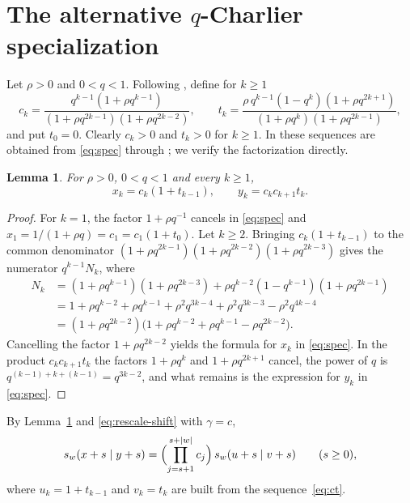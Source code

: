 \documentclass[11pt]{amsart}
\newtheorem{lemma}[theorem]{Lemma}
\theoremstyle{definition}
\theoremstyle{remark}
\numberwithin{equation}{section}
\begin{document}
\section{The alternative \texorpdfstring{$q$}{q}-Charlier specialization}\label{sec:spec}

Let $\rho>0$ and $0<q<1$. Following \cite[Conjecture~6.3]{PS26}, define for $k\ge1$
\begin{equation}\label{eq:ct}
c_k=\frac{q^{k-1}(1+\rho q^{k-1})}{(1+\rho q^{2k-1})(1+\rho q^{2k-2})},\qquad
t_k=\frac{\rho\,q^{k-1}(1-q^k)(1+\rho q^{2k+1})}{(1+\rho q^{k})(1+\rho q^{2k-1})},
\end{equation}
and put $t_0=0$. Clearly $c_k>0$ and $t_k>0$ for $k\ge1$. In \cite{PS26} these sequences are obtained from \eqref{eq:spec} through \cite[Proposition~4.4]{PS26}; we verify the factorization directly.

\begin{lemma}\label{lem:factor}
For $\rho>0$, $0<q<1$ and every $k\ge1$,
\[
x_k=c_k(1+t_{k-1}),\qquad y_k=c_kc_{k+1}t_k.
\]
\end{lemma}

\begin{proof}
For $k=1$, the factor $1+\rho q^{-1}$ cancels in \eqref{eq:spec} and $x_1=1/(1+\rho q)=c_1=c_1(1+t_0)$. Let $k\ge2$. Bringing $c_k(1+t_{k-1})$ to the common denominator $(1+\rho q^{2k-1})(1+\rho q^{2k-2})(1+\rho q^{2k-3})$ gives the numerator $q^{k-1}N_k$, where
\[
\begin{aligned}
N_k&=(1+\rho q^{k-1})(1+\rho q^{2k-3})+\rho q^{k-2}(1-q^{k-1})(1+\rho q^{2k-1})\\
&=1+\rho q^{k-2}+\rho q^{k-1}+\rho^2q^{3k-4}+\rho^2q^{3k-3}-\rho^2q^{4k-4}\\
&=(1+\rho q^{2k-2})\bigl(1+\rho q^{k-2}+\rho q^{k-1}-\rho q^{2k-2}\bigr).
\end{aligned}
\]
Cancelling the factor $1+\rho q^{2k-2}$ yields the formula for $x_k$ in \eqref{eq:spec}. In the product $c_kc_{k+1}t_k$ the factors $1+\rho q^{k}$ and $1+\rho q^{2k+1}$ cancel, the power of $q$ is $q^{(k-1)+k+(k-1)}=q^{3k-2}$, and what remains is the expression for $y_k$ in \eqref{eq:spec}.
\end{proof}

By Lemma~\ref{lem:factor} and \eqref{eq:rescale-shift} with $\gamma=c$,
\begin{equation}\label{eq:reduction}
s_w(x+s\mid y+s)=\Bigl(\prod_{j=s+1}^{s+|w|}c_j\Bigr)\,s_w(u+s\mid v+s)\qquad(s\ge0),
\end{equation}
where $u_k=1+t_{k-1}$ and $v_k=t_k$ are built from the sequence~\eqref{eq:ct}.
\end{document}
